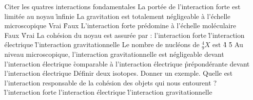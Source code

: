 \q
Citer les quatres interactions fondamentales
\q
La portée de l'interaction forte est
\rv
limitée au noyau
\r
infinie
\q
La gravitation est totalement négligeable à l'échelle microscopique
\rv
Vrai
\r
Faux
\q
L'interaction forte prédomine à l'échelle moléculaire
\rv
Faux
\r
Vrai
\q
La cohésion du noyau est assurée par :
\rv
l'interaction forte
\r
l'interaction électrique
\r
l'interaction gravitationnelle
\q
Le nombre de nucléons de $_9^4X$ est 
\r
4
\r
5
\q 
Au niveau microscopique, l'interaction gravitationnelle est 
\rv
négligeable devant l'interaction électrique
\r
comparable à l'interaction électrique
\r
prépondérante devant l'interaction électrique
\q
Définir deux isotopes. Donner un exemple.
\q
Quelle est l'interaction responsable de la cohésion des objets qui nous entourent ?
\r
l'interaction forte
\rv
l'interaction électrique
\r
l'interaction gravitationnelle




